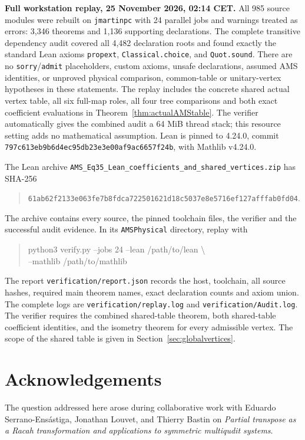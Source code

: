 \documentclass[10pt,a4paper]{article}
\newcommand{\lean}[1]{{\small\nolinkurl{#1}}}
\newenvironment{revision}{\begingroup}{\endgroup}
\begin{document}
\begin{revision}
\noindent\textbf{Full workstation replay, 25 November 2026, 02:14 CET.}
All 985 source modules were rebuilt on
\lean{jmartinpc} with 24 parallel jobs and warnings treated as errors:
3,346 theorems and 1,136 supporting declarations.
The complete transitive dependency audit covered all 4,482
declaration roots and found exactly the standard Lean axioms
\lean{propext}, \lean{Classical.choice}, and \lean{Quot.sound}.
There are no \lean{sorry}/\lean{admit} placeholders, custom axioms,
unsafe declarations, assumed AMS identities, or unproved physical
comparison, common-table or unitary-vertex hypotheses in these statements.
The replay includes the concrete shared actual vertex table, all six
full-map roles, all four tree comparisons and both exact coefficient
evaluations in Theorem~\ref{thm:actualAMStable}.
The verifier automatically gives the combined audit a 64 MiB thread
stack; this resource setting adds no mathematical assumption.
Lean is pinned to 4.24.0, commit
\lean{797c613eb9b6d4ec95db23e3e00af9ac6657f24b}, with Mathlib v4.24.0.

The Lean archive \lean{AMS_Eq35_Lean_coefficients_and_shared_vertices.zip} has SHA-256
\begin{quote}\small
\nolinkurl{61ab62f2133e063fe7b8fdca722501621d18c5037e8e5716ef127afffab0fd04}.
\end{quote}
The archive contains every source, the pinned toolchain files, the
verifier and the successful audit evidence. In its \lean{AMSPhysical}
directory, replay with
\begin{quote}\small\ttfamily
python3 verify.py --jobs 24 --lean /path/to/lean \textbackslash\\
\hspace*{8mm}--mathlib /path/to/mathlib
\end{quote}
The report \lean{verification/report.json} records the host, toolchain,
all source hashes, required main theorem names, exact declaration counts
and axiom union. The complete logs are
\lean{verification/replay.log} and \lean{verification/Audit.log}.
The verifier requires the combined shared-table theorem, both
shared-table coefficient identities, and the isometry theorem for every
admissible vertex. The scope of the shared table is given in
Section~\ref{sec:globalvertices}.
\end{revision}


\section*{Acknowledgements}
The question addressed here arose during collaborative work with
Eduardo Serrano-Ens\'astiga, Jonathan Louvet, and Thierry Bastin on
\emph{Partial transpose as a Racah transformation and applications to
symmetric multiqudit systems}.
\end{document}
